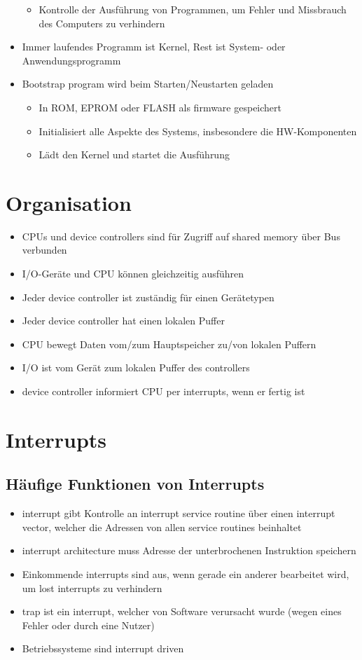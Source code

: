 \documentclass[a4paper]{scrreprt}
\begin{document}
\begin{itemize}
		\begin{itemize}
			\item Kontrolle der Ausführung von Programmen, um Fehler und Missbrauch des Computers zu verhindern
		\end{itemize}
	\item Immer laufendes Programm ist Kernel, Rest ist System- oder Anwendungsprogramm
	\item Bootstrap program wird beim Starten/Neustarten geladen
		\begin{itemize}
			\item In ROM, EPROM oder FLASH als firmware gespeichert
			\item Initialisiert alle Aspekte des Systems, insbesondere die HW-Komponenten
			\item Lädt den Kernel und startet die Ausführung
		\end{itemize}
\end{itemize}

\section{Organisation}
\begin{itemize}
	\item CPUs und device controllers sind für Zugriff auf shared memory über Bus verbunden
	\item I/O-Geräte und CPU können gleichzeitig ausführen
	\item Jeder device controller ist zuständig für einen Gerätetypen
	\item Jeder device controller hat einen lokalen Puffer
	\item CPU bewegt Daten vom/zum Hauptspeicher zu/von lokalen Puffern
	\item I/O ist vom Gerät zum lokalen Puffer des controllers
	\item device controller informiert CPU per interrupts, wenn er fertig ist
\end{itemize}


\section{Interrupts}
\subsection{Häufige Funktionen von Interrupts}
\begin{itemize}
	\item interrupt gibt Kontrolle an interrupt service routine über einen interrupt vector, welcher die Adressen von allen service routines beinhaltet
	\item interrupt architecture muss Adresse der unterbrochenen Instruktion speichern
	\item Einkommende interrupts sind aus, wenn gerade ein anderer bearbeitet wird, um lost interrupts zu verhindern
	\item trap ist ein interrupt, welcher von Software verursacht wurde (wegen eines Fehler oder durch eine Nutzer)
	\item Betriebssysteme sind interrupt driven
\end{itemize}
\end{document}
